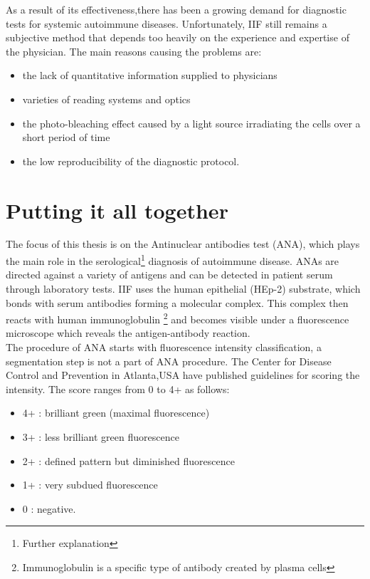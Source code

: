 As a result of its effectiveness,there has been a growing demand for diagnostic tests for systemic autoimmune diseases. Unfortunately,  IIF still remains a subjective method that depends too heavily on the experience and expertise of the physician. The main reasons causing the problems are:
\begin{itemize}
	\item the lack of quantitative information supplied to physicians
	\item varieties of reading systems and optics
	\item the photo-bleaching effect caused by a light source irradiating the cells over a short period of time
	\item the low reproducibility of the diagnostic protocol.
\end{itemize}

\section{Putting it all together}

The focus of this thesis is on the Antinuclear antibodies  test (ANA), which plays the main role in the serological\footnote{Further explanation} diagnosis of autoimmune disease. ANAs are directed against a variety of antigens and can be detected in patient serum through laboratory tests. IIF uses the human epithelial (HEp-2) substrate, which bonds with serum antibodies forming a molecular complex. This complex then reacts with human immunoglobulin \footnote{Immunoglobulin is a specific type of antibody created by plasma cells} and becomes visible under a fluorescence microscope which reveals the antigen-antibody reaction. \\

The procedure of ANA starts with  fluorescence intensity classification, a segmentation step is not a part of ANA procedure. The Center for Disease Control and Prevention in Atlanta,USA have published  guidelines \cite{nakamura1996quality} for scoring the intensity. The score ranges from 0 to 4+ as follows:
\begin{itemize}
	\item 4+ : brilliant green (maximal fluorescence)
	\item 3+ : less brilliant green fluorescence
	\item 2+ : defined pattern but diminished fluorescence
	\item 1+ : very subdued fluorescence
	\item 0 : negative.
\end{itemize}

